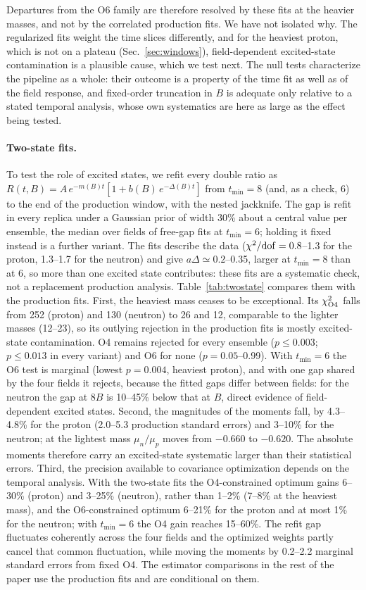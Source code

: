 \documentclass[aps,prd,reprint,twocolumn,superscriptaddress,nofootinbib,longbibliography]{revtex4-2}
\begin{document}
Departures from the O6 family are therefore resolved by these fits at the heavier masses, and not by the correlated production fits. We have not isolated why. The regularized fits weight the time slices differently, and for the heaviest proton, which is not on a plateau (Sec.~\ref{sec:windows}), field-dependent excited-state contamination is a plausible cause, which we test next. The null tests characterize the pipeline as a whole: their outcome is a property of the time fit as well as of the field response, and fixed-order truncation in $B$ is adequate only relative to a stated temporal analysis, whose own systematics are here as large as the effect being tested.

\paragraph{Two-state fits.} To test the role of excited states, we refit every double ratio as $R(t,B)=A\,e^{-m(B)t}[1+b(B)\,e^{-\Delta(B)t}]$ from $t_{\min}=8$ (and, as a check, 6) to the end of the production window, with the nested jackknife. The gap is refit in every replica under a Gaussian prior of width 30\% about a central value per ensemble, the median over fields of free-gap fits at $t_{\min}=6$; holding it fixed instead is a further variant. The fits describe the data ($\chi^2/{\rm dof}=0.8$--1.3 for the proton, 1.3--1.7 for the neutron) and give $a\Delta\simeq0.2$--0.35, larger at $t_{\min}=8$ than at 6, so more than one excited state contributes: these fits are a systematic check, not a replacement production analysis. Table~\ref{tab:twostate} compares them with the production fits. First, the heaviest mass ceases to be exceptional. Its $\chi^2_{\rm O4}$ falls from 252 (proton) and 130 (neutron) to 26 and 12, comparable to the lighter masses (12--23), so its outlying rejection in the production fits is mostly excited-state contamination. O4 remains rejected for every ensemble ($p\le0.003$; $p\le0.013$ in every variant) and O6 for none ($p=0.05$--0.99). With $t_{\min}=6$ the O6 test is marginal (lowest $p=0.004$, heaviest proton), and with one gap shared by the four fields it rejects, because the fitted gaps differ between fields: for the neutron the gap at $8B$ is 10--45\% below that at $B$, direct evidence of field-dependent excited states. Second, the magnitudes of the moments fall, by 4.3--4.8\% for the proton (2.0--5.3 production standard errors) and 3--10\% for the neutron; at the lightest mass $\mu_n/\mu_p$ moves from $-0.660$ to $-0.620$. The absolute moments therefore carry an excited-state systematic larger than their statistical errors. Third, the precision available to covariance optimization depends on the temporal analysis. With the two-state fits the O4-constrained optimum gains 6--30\% (proton) and 3--25\% (neutron), rather than 1--2\% (7--8\% at the heaviest mass), and the O6-constrained optimum 6--21\% for the proton and at most 1\% for the neutron; with $t_{\min}=6$ the O4 gain reaches 15--60\%. The refit gap fluctuates coherently across the four fields and the optimized weights partly cancel that common fluctuation, while moving the moments by 0.2--2.2 marginal standard errors from fixed O4. The estimator comparisons in the rest of the paper use the production fits and are conditional on them.
\end{document}
